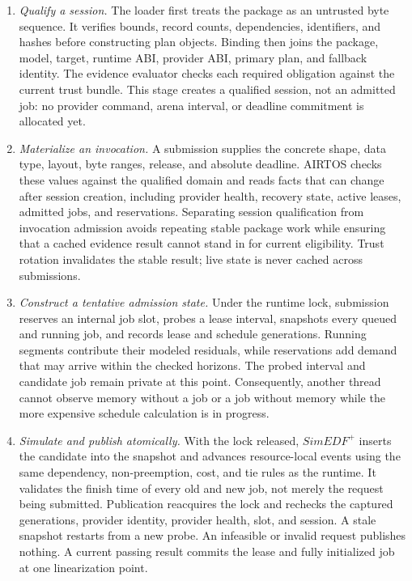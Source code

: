 \documentclass[lettersize,journal]{IEEEtran}
\begin{document}
\begin{enumerate}
  \item \emph{Qualify a session.} The loader first treats the package as an
  untrusted byte sequence. It verifies bounds, record counts, dependencies,
  identifiers, and hashes before constructing plan objects. Binding then joins
  the package, model, target, runtime ABI, provider ABI, primary plan, and
  fallback identity. The evidence evaluator checks each required obligation
  against the current trust bundle. This stage creates a qualified session,
  not an admitted job: no provider command, arena interval, or deadline
  commitment is allocated yet.

  \item \emph{Materialize an invocation.} A submission supplies the concrete
  shape, data type, layout, byte ranges, release, and absolute deadline. AIRTOS
  checks these values against the qualified domain and reads facts that can
  change after session creation, including provider health, recovery state,
  active leases, admitted jobs, and reservations. Separating session
  qualification from invocation admission avoids repeating stable package work
  while ensuring that a cached evidence result cannot stand in for current
  eligibility. Trust rotation invalidates the stable result; live state is
  never cached across submissions.

  \item \emph{Construct a tentative admission state.} Under the runtime lock,
  submission reserves an internal job slot, probes a lease interval, snapshots
  every queued and running job, and records lease and schedule generations.
  Running segments contribute their modeled residuals, while reservations add
  demand that may arrive within the checked horizons. The probed interval and
  candidate job remain private at this point. Consequently, another thread
  cannot observe memory without a job or a job without memory while the more
  expensive schedule calculation is in progress.

  \item \emph{Simulate and publish atomically.} With the lock released,
  $SimEDF^+$ inserts the candidate into the snapshot and advances resource-local
  events using the same dependency, non-preemption, cost, and tie rules as the
  runtime. It validates the finish time of every old and new job, not merely the
  request being submitted. Publication reacquires the lock and rechecks the
  captured generations, provider identity, provider health, slot, and session.
  A stale snapshot restarts from a new probe. An infeasible or invalid request
  publishes nothing. A current passing result commits the lease and fully
  initialized job at one linearization point.


\end{enumerate}
\end{document}
